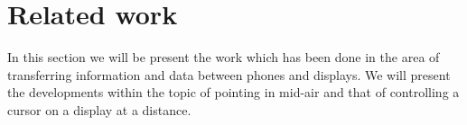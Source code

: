 \section{Related work} \label{sec:relatedwork}
In this section we will be present the work which has been done in the area of transferring information and data between phones and displays.
We will present the developments within the topic of pointing in mid-air and that of controlling a cursor on a display at a distance.
